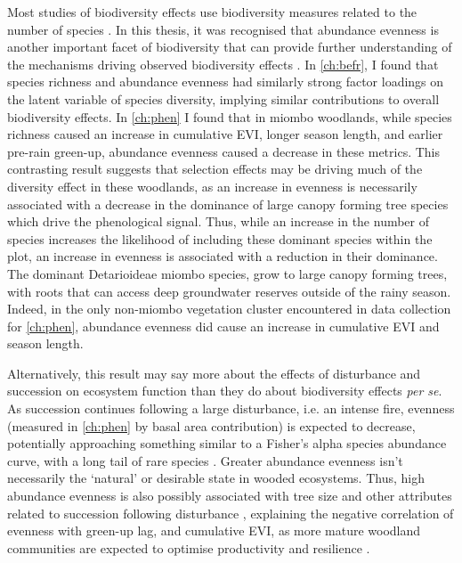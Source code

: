 \begin{refsection}
Most studies of biodiversity effects use biodiversity measures related to the number of species \citep{Tilman2014}. In this thesis, it was recognised that abundance evenness is another important facet of biodiversity that can provide further understanding of the mechanisms driving observed biodiversity effects \citep{Chalcraft2004}. In \autoref{ch:befr}, I found that species richness and abundance evenness had similarly strong factor loadings on the latent variable of species diversity, implying similar contributions to overall biodiversity effects. In \autoref{ch:phen} I found that in miombo woodlands, while species richness caused an increase in cumulative EVI, longer season length, and earlier pre-rain green-up, abundance evenness caused a decrease in these metrics. This contrasting result suggests that selection effects may be driving much of the diversity effect in these woodlands, as an increase in evenness is necessarily associated with a decrease in the dominance of large canopy forming tree species which drive the phenological signal. Thus, while an increase in the number of species increases the likelihood of including these dominant species within the plot, an increase in evenness is associated with a reduction in their dominance. The dominant Detarioideae miombo species, grow to large canopy forming trees, with roots that can access deep groundwater reserves outside of the rainy season. Indeed, in the only non-miombo vegetation cluster encountered in data collection for \autoref{ch:phen}, abundance evenness did cause an increase in cumulative EVI and season length.

Alternatively, this result may say more about the effects of disturbance and succession on ecosystem function than they do about biodiversity effects \textit{per se}. As succession continues following a large disturbance, i.e. an intense fire, evenness (measured in \autoref{ch:phen} by basal area contribution) is expected to decrease, potentially approaching something similar to a Fisher's alpha species abundance curve, with a long tail of rare species \citep{Morozov2008, Sheil2001}. Greater abundance evenness isn't necessarily the `natural' or desirable state in wooded ecosystems. Thus, high abundance evenness is also possibly associated with tree size and other attributes related to succession following disturbance \citep{Holdo2006}, explaining the negative correlation of evenness with green-up lag, and cumulative EVI, as more mature woodland communities are expected to optimise productivity and resilience \citep{Hector2007}.


\end{refsection}
